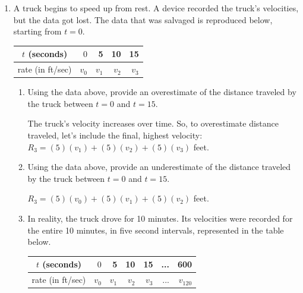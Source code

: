 \documentclass{article}
\begin{document}
\begin{enumerate}
\item A truck begins to speed up from rest. A device recorded the truck's velocities, but the data got lost. The data that was salvaged is reproduced below, starting from $t=0$.
\begin{center}
    \begin{tabular}{  | c | r  r  r  r  | } 
    \hline
      $t$ (seconds)& $0$& 5& 10& 15\\
      \hline
      rate (in ft/sec)& $v_0$& $v_1$& $v_2$& $v_3$ \\ \hline
    \end{tabular}
\end{center}
  \begin{enumerate}
    \item
      \begin{problem}
        Using the data above, provide an overestimate of the distance traveled by the truck
        between $t = 0$ and $t = 15$.
      \end{problem}
      
        \begin{solution}
        The truck's velocity increases over time. So, to overestimate distance traveled, let's include the final, highest velocity:
        $R_3 = (5)(v_1)+(5)(v_2)+(5)(v_3)$ feet.
      \end{solution}
  \vfill 
    

    \item
      \begin{problem}
        Using the data above, provide an underestimate of the distance traveled by the truck
        between $t = 0$ and $t = 15$.
      \end{problem}
      
      \begin{solution}
        $R_3 = (5)(v_0)+(5)(v_1)+(5)(v_2)$ feet.
      \end{solution}
\vfill

\newpage

\item In reality, the truck drove for 10 minutes. Its velocities were recorded for the entire 10 minutes, in five second intervals, represented in the table below.
\begin{center}
    \begin{tabular}{  | c | r  r  r  r  r  r  | } 
    \hline
      $t$ (seconds)& $0$& 5& 10& 15&  ... &600\\
      \hline
      rate (in ft/sec)& $v_0$& $v_1$& $v_2$& $v_3$& ...& $v_{120}$ \\ \hline
    \end{tabular}
\end{center}


\end{enumerate}
\end{enumerate}
\end{document}

